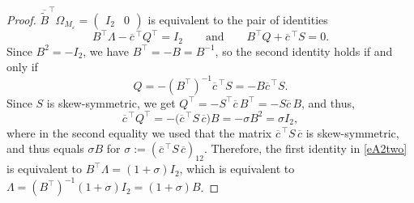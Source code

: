 \documentclass[11pt]{amsart}
\theoremstyle{plain}
\def \ep {\varepsilon}
\def \ol {\overline}
\begin{document}
\begin{proof}
    $\ol{\widetilde{B}}^{\top} \Omega_{M_\ep} = \begin{pmatrix} I_2 & 0\end{pmatrix}$
is equivalent to the pair of identities
\begin{equation}
\label{eA2two}
B^{\top} \Lambda - \overline{c}^{\,\top} Q^{\top} = I_2
\qquad\text{and}\qquad
B^{\top} Q + \overline{c}^{\,\top} S = 0 .
\end{equation}
Since $B^2 = -I_2$, we have $B^{\top} = -B = B^{-1}$, so the second identity holds if and only if
$$Q = - (B^{\top})^{-1} \overline{c}^{\,\top} S = - B \overline{c}^{\,\top} S.$$ Since $S$ is skew-symmetric, we get
$Q^{\top} = - S^{\top} \overline{c} \, B^{\top} = - S \overline{c} \, B$, and thus, 
\[
\overline{c}^{\,\top} Q^{\top}
= - \bigl( \overline{c}^{\,\top} S \, \overline{c} \bigr) B
= - \sigma B^2 = \sigma I_2 ,
\]
where in the second equality we used that the matrix $\overline{c}^{\,\top} S \, \overline{c}$ is skew-symmetric, and thus equals $\sigma B$ for $\sigma := (\overline{c}^{\,\top} S \, \overline{c})_{12}$. Therefore, the first identity in \eqref{eA2two} is equivalent to
$B^{\top} \Lambda = (1+\sigma) I_2$, which is equivalent to
$\Lambda = (B^{\top})^{-1} (1+\sigma) I_2 = (1+\sigma) B$.
\end{proof}
\end{document}
